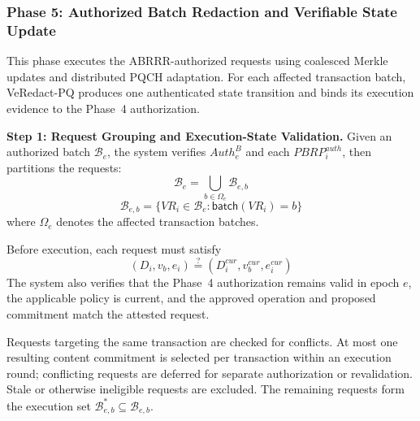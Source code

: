 \documentclass[lettersize,journal]{IEEEtran}
\begin{document}
\subsubsection*{\textbf{Phase 5: Authorized Batch Redaction
and Verifiable State Update}}

This phase executes the ABRRR-authorized requests
using coalesced Merkle updates and distributed PQCH
adaptation. For each affected transaction batch,
VeRedact-PQ produces one authenticated state
transition and binds its execution evidence to
the Phase~4 authorization.

\medskip
\noindent\textbf{Step 1: Request Grouping and
Execution-State Validation.}
Given an authorized batch $\mathcal{B}_e$, the
system verifies $Auth_e^B$ and each
$PBRP_i^{auth}$, then partitions the requests:
\begin{equation}
\mathcal{B}_e=\bigcup_{b\in\Omega_e}\mathcal{B}_{e,b}
\end{equation}
\begin{equation}
\mathcal{B}_{e,b}=\{VR_i\in\mathcal{B}_e:
\mathsf{batch}(VR_i)=b\}
\end{equation}
where $\Omega_e$ denotes the affected transaction
batches.

Before execution, each request must satisfy
\begin{equation}
(D_i,v_b,e_i)
\stackrel{?}{=}
(D_i^{cur},v_b^{cur},e_i^{cur})
\end{equation}
The system also verifies that the Phase~4
authorization remains valid in epoch $e$,
the applicable policy is current, and the
approved operation and proposed commitment
match the attested request.

Requests targeting the same transaction are
checked for conflicts. At most one resulting
content commitment is selected per transaction
within an execution round; conflicting requests
are deferred for separate authorization or
revalidation. Stale or otherwise ineligible
requests are excluded. The remaining requests
form the execution set
$\mathcal{B}_{e,b}^{*}\subseteq\mathcal{B}_{e,b}$.
\end{document}
